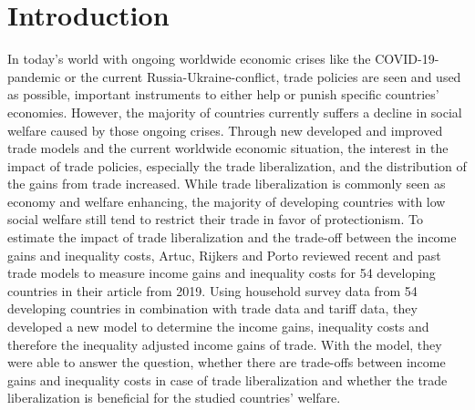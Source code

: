 \chapter{Introduction}

In today's world with ongoing worldwide economic crises like the COVID-19-pandemic or the current Russia-Ukraine-conflict,
trade policies are seen and used as possible, important instruments to either help or punish specific countries' economies. 
However, the majority of countries currently suffers a decline in social welfare caused by those ongoing crises. Through new 
developed and improved trade models and the current worldwide economic situation, the interest in the impact of trade policies,
especially the trade liberalization, and the distribution of the gains from trade increased. While trade liberalization is 
commonly seen as economy and welfare enhancing, the majority of developing countries with low social welfare
still tend to restrict their trade in favor of protectionism. To estimate the impact of trade liberalization and the trade-off
between the income gains and inequality costs, Artuc, Rijkers and Porto reviewed recent and past trade models to measure 
income gains and inequality costs for 54 developing countries in their article from 2019. Using household survey data from 54
developing countries in combination with trade data and tariff data, they developed a new model to determine the income gains,
inequality costs and therefore the inequality adjusted income gains of trade. With the model, they were able to answer the
question, whether there are trade-offs between income gains and inequality costs in case of trade liberalization and whether
the trade liberalization is beneficial for the studied countries' welfare.\\

